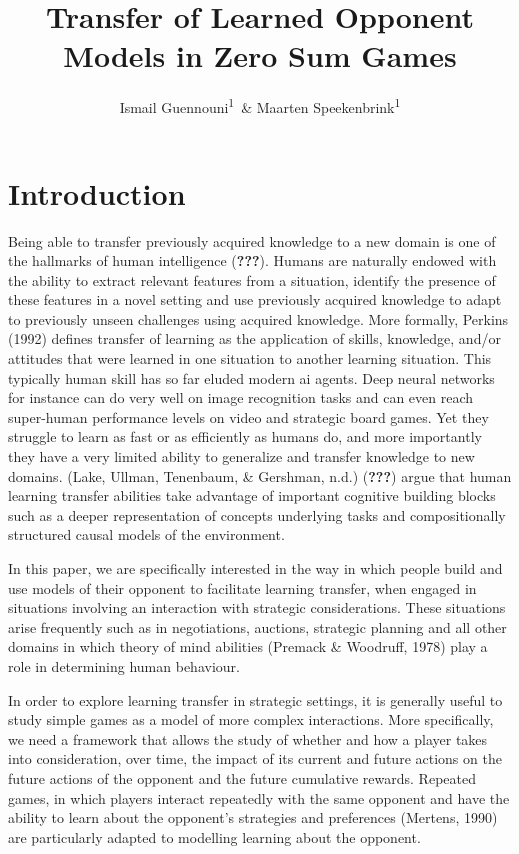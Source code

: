 \documentclass[man,floatsintext]{apa6}
\title{Transfer of Learned Opponent Models in Zero Sum Games}
\author{Ismail Guennouni\textsuperscript{1}~\& Maarten Speekenbrink\textsuperscript{1}}
\date{}
\begin{document}
\maketitle

\hypertarget{introduction}{%
\section{Introduction}\label{introduction}}

Being able to transfer previously acquired knowledge to a new domain is one of the hallmarks of human intelligence ({\textbf{???}}). Humans are naturally endowed with the ability to extract relevant features from a situation, identify the presence of these features in a novel setting and use previously acquired knowledge to adapt to previously unseen challenges using acquired knowledge. More formally, Perkins (1992) defines transfer of learning as the application of skills, knowledge, and/or attitudes that were learned in one situation to another learning situation. This typically human skill has so far eluded modern ai agents. Deep neural networks for instance can do very well on image recognition tasks and can even reach super-human performance levels on video and strategic board games. Yet they struggle to learn as fast or as efficiently as humans do, and more importantly they have a very limited ability to generalize and transfer knowledge to new domains. (Lake, Ullman, Tenenbaum, \& Gershman, n.d.) ({\textbf{???}}) argue that human learning transfer abilities take advantage of important cognitive building blocks such as a deeper representation of concepts underlying tasks and compositionally structured causal models of the environment.

In this paper, we are specifically interested in the way in which people build and use models of their opponent to facilitate learning transfer, when engaged in situations involving an interaction with strategic considerations. These situations arise frequently such as in negotiations, auctions, strategic planning and all other domains in which theory of mind abilities (Premack \& Woodruff, 1978) play a role in determining human behaviour.

In order to explore learning transfer in strategic settings, it is generally useful to study simple games as a model of more complex interactions. More specifically, we need a framework that allows the study of whether and how a player takes into consideration, over time, the impact of its current and future actions on the future actions of the opponent and the future cumulative rewards. Repeated games, in which players interact repeatedly with the same opponent and have the ability to learn about the opponent's strategies and preferences (Mertens, 1990) are particularly adapted to modelling learning about the opponent.
\end{document}
